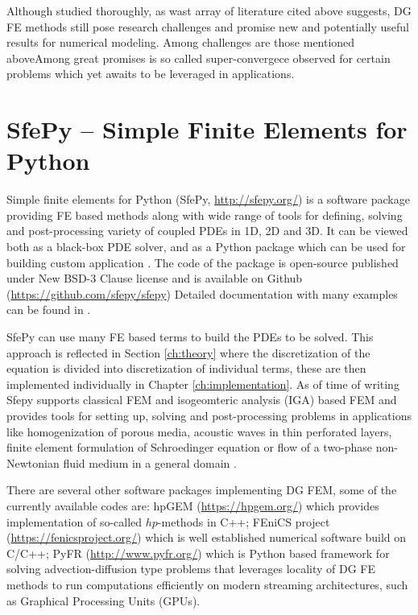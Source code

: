 Although studied thoroughly, as wast array of literature cited above suggests, DG FE 
methods still pose research challenges and promise new and potentially useful results for 
numerical modeling. Among challenges are those mentioned aboveAmong great promises is so 
called super-convergece observed for certain problems \cite{Roe2017} which yet awaits to 
be leveraged in applications.


\section{SfePy -- Simple Finite Elements for Python}

Simple finite elements for Python (SfePy, 
\url{http://sfepy.org/}) is a software 
package providing FE based methods along with wide range of tools for defining, solving 
and post-processing variety of coupled PDEs in 1D, 2D and 3D. It can be viewed both as a 
black-box PDE solver, and as a Python package which can be used for building custom 
application \cite{Cimrman_Lukes_Rohan_2019}. The code of the package is open-source 
published under New BSD-3 Clause license \cite{bsd3-lic} and is available on Github 
(\url{https://github.com/sfepy/sfepy}) %
Detailed documentation with many examples can be found in 
\cite{sfepy-doc}.

SfePy can use many FE based terms to 
build the PDEs to be solved. This approach is reflected in Section \ref{ch:theory}
where the discretization of the equation is divided into discretization of individual 
terms, these are then implemented individually in Chapter \ref{ch:implementation}. As of 
time of writing Sfepy supports classical FEM and isogeomteric analysis (IGA) based FEM 
and 
provides tools for setting up, solving and post-processing problems in applications like 
homogenization of porous media, acoustic waves in thin perforated layers,  finite element 
formulation of Schroedinger equation or flow of a two-phase non-Newtonian fluid medium in 
a general domain \cite{Cimrman_Lukes_Rohan_2019}.

There are several other software packages implementing  DG FEM, some of the currently 
available codes are:
hpGEM \cite{hpgem2007} (\url{https://hpgem.org/}) which provides implementation of 
so-called $hp$-methods in C++; 
FEniCS project \cite{fenics2015} (\url{https://fenicsproject.org/}) which is well 
established numerical software build on C/C++;
PyFR \cite{pyfr2014} (\url{http://www.pyfr.org/}) which is  Python based framework for 
solving advection-diffusion type problems that leverages locality of DG FE methods to run 
computations efficiently on modern streaming architectures, such as Graphical 
Processing Units (GPUs).






